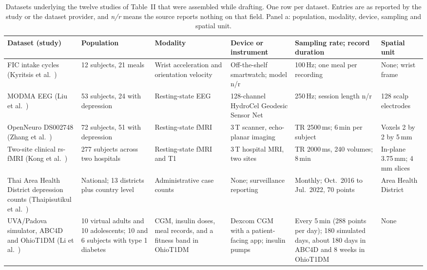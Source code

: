 \documentclass[journal]{IEEEtran}
\renewcommand{\thetable}{S\arabic{table}}
\begin{document}
\begin{table}[tbp]
\centering
\renewcommand{\thetable}{S2a}
\caption{Datasets underlying the twelve studies of Table~II that were assembled while drafting.
One row per dataset. Entries are as reported by the study or the dataset provider, and
\emph{n/r} means the source reports nothing on that field. Panel a: population, modality, device, sampling and spatial unit.}
\label{tab:S2a}
\footnotesize
\setlength{\tabcolsep}{2.5pt}
\renewcommand{\arraystretch}{1.05}
\begin{tabularx}{\textwidth}{L{2.5cm} L{2.6cm} L{2.4cm} L{2.8cm} L{2.9cm} X}
\toprule
\textbf{Dataset (study)} & \textbf{Population} & \textbf{Modality} & \textbf{Device or instrument} & \textbf{Sampling rate; record duration} & \textbf{Spatial unit} \\
\midrule
FIC intake cycles (Kyritsis et al.~\cite{Kyritsis2019EatingBehavior}) & 12 subjects, 21 meals & Wrist acceleration and orientation velocity & Off-the-shelf smartwatch; model n/r & 100\,Hz; one meal per recording & None; wrist frame \\
\addlinespace[1pt]
MODMA EEG (Liu et al.~\cite{2}) & 53 subjects, 24 with depression & Resting-state EEG & 128-channel HydroCel Geodesic Sensor Net & 250\,Hz; session length n/r & 128 scalp electrodes \\
\addlinespace[1pt]
OpenNeuro DS002748 (Zhang et al.~\cite{9}) & 72 subjects, 51 with depression & Resting-state fMRI & 3\,T scanner, echo-planar imaging & TR 2500\,ms; 6\,min per subject & Voxels 2 by 2 by 5\,mm \\
\addlinespace[1pt]
Two-site clinical rs-fMRI (Kong et al.~\cite{4}) & 277 subjects across two hospitals & Resting-state fMRI and T1 & 3\,T hospital MRI, two sites & TR 2000\,ms, 240 volumes; 8\,min & In-plane 3.75\,mm; 4\,mm slices \\
\addlinespace[1pt]
Thai Area Health District depression counts (Thaipisutikul et al.~\cite{3}) & National; 13 districts plus country level & Administrative case counts & None; surveillance reporting & Monthly; Oct.\ 2016 to Jul.\ 2022, 70 points & Area Health District \\
\addlinespace[1pt]
UVA/Padova simulator, ABC4D and OhioT1DM (Li et al.~\cite{Li2020GluNet}) & 10 virtual adults and 10 adolescents; 10 and 6 subjects with type 1 diabetes & CGM, insulin doses, meal records, and a fitness band in OhioT1DM & Dexcom CGM with a patient-facing app; insulin pumps & Every 5\,min (288 points per day); 180 simulated days, about 180 days in ABC4D and 8 weeks in OhioT1DM & None \\

\end{tabularx}
\end{table}
\end{document}
